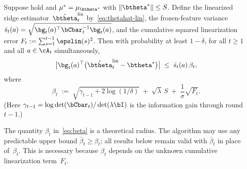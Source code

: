 \begin{lemma}%
\label{lem:confidence}
Suppose  hold and
$\mu^*=\mu_{\btheta^*}$ with $\|\btheta^*\|\le S$.
Define the linearized ridge estimator~$\hat\btheta_t^{\mathrm{lin}}$
by~\eqref{eq:thetahat-lin}, the frozen-feature variance
$\bar s_t(a)=\sqrt{\bg_t(a)^\top\bCbar_t^{-1}\bg_t(a)}$, and
the cumulative squared linearization error
$F_t := \sum_{s=1}^{t-1}\epslin(s)^2$.
Then with probability at least $1-\delta$, for all $t\ge 1$ and all
$a\in\cA_t$ simultaneously,
\begin{equation}\label{eq:conf-lin}
  \bigl|\bg_t(a)^\top
    \bigl(\hat\btheta_t^{\mathrm{lin}}-\btheta^*\bigr)\bigr|
  \;\le\;
  \bar s_t(a)\,\beta_t,
\end{equation}
where
\begin{equation}\label{eq:beta}
  \beta_t
  \;:=\;
  \sqrt{\gamma_{t-1} + 2\log(1/\delta)}
  \;+\; \sqrt{\lambda}\,S
  \;+\; \frac{1}{\sigma}\sqrt{F_t}.
\end{equation}
(Here $\gamma_{t-1}=\log\det(\bCbar_t)/\det(\lambda\bI)$ is the
information gain through round $t{-}1$.)

The quantity $\beta_t$ in~\eqref{eq:beta} is a theoretical radius.
The algorithm may use any predictable upper bound
$\bar\beta_t \ge \beta_t$; all results below remain valid with
$\bar\beta_t$ in place of~$\beta_t$.
This is necessary because $\beta_t$ depends on the unknown cumulative
linearization term~$F_t$.
\end{lemma}
